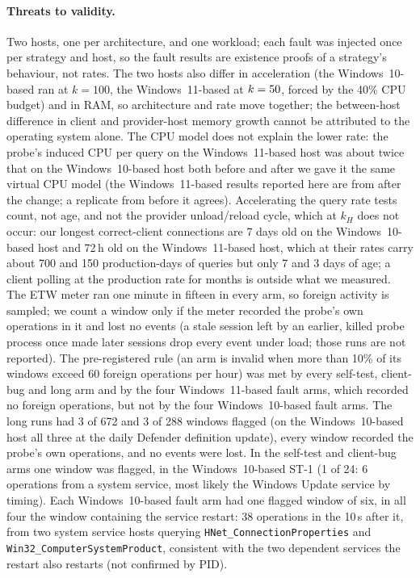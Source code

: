 \documentclass[letterpaper,twocolumn,10pt]{article}
\newcommand{\code}[1]{\texttt{\small #1}}
\begin{document}
\paragraph{Threats to validity.}
Two hosts, one per architecture, and one workload; each fault was injected once per strategy and host, so the fault results are existence proofs of a strategy's behaviour, not rates.
The two hosts also differ in acceleration (the Windows~10-based ran at $k=100$, the Windows~11-based at $k=50{}$, forced by the 40\% CPU budget) and in RAM, so architecture and rate move together; the between-host difference in client and provider-host memory growth cannot be attributed to the operating system alone. The CPU model does not explain the lower rate: the probe's induced CPU per query on the Windows~11-based host was about twice that on the Windows~10-based host both before and after we gave it the same virtual CPU model (the Windows~11-based results reported here are from after the change; a replicate from before it agrees).
Accelerating the query rate tests count, not age, and not the provider unload/reload cycle, which at $k_H$ does not occur: our longest correct-client connections are 7 days old on the Windows~10-based host and 72\,h old on the Windows~11-based host, which at their rates carry about 700 and 150 production-days of queries but only 7 and 3 days of age; a client polling at the production rate for months is outside what we measured.
The ETW meter ran one minute in fifteen in every arm, so foreign activity is sampled; we count a window only if the meter recorded the probe's own operations in it and lost no events (a stale session left by an earlier, killed probe process once made later sessions drop every event under load; those runs are not reported).
The pre-registered rule (an arm is invalid when more than 10\% of its windows exceed 60 foreign operations per hour) was met by every self-test, client-bug and long arm and by the four Windows~11-based fault arms, which recorded no foreign operations, but not by the four Windows~10-based fault arms.
The long runs had 3 of 672 and 3 of 288 windows flagged (on the Windows~10-based host all three at the daily Defender definition update), every window recorded the probe's own operations, and no events were lost.
In the self-test and client-bug arms one window was flagged, in the Windows~10-based ST-1 (1 of 24: 6 operations from a system service, most likely the Windows Update service by timing).
Each Windows~10-based fault arm had one flagged window of six, in all four the window containing the service restart: 38 operations in the 10\,s after it, from two system service hosts querying \code{HNet\_ConnectionProperties} and \code{Win32\_ComputerSystemProduct}, consistent with the two dependent services the restart also restarts (not confirmed by PID).
\end{document}
